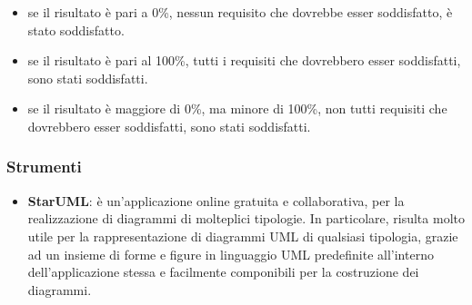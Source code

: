\begin{itemize}
\begin{itemize}
								\begin{itemize}
									\item se il risultato è pari a 0\%, nessun requisito che dovrebbe esser soddisfatto, è stato soddisfatto.
									\item se il risultato è pari al 100\%, tutti i requisiti che dovrebbero esser soddisfatti,  sono stati soddisfatti.
									\item se il risultato è maggiore di 0\%, ma minore di 100\%, non tutti requisiti che dovrebbero esser soddisfatti, sono stati soddisfatti.
								\end{itemize}
						\end{itemize}
				\end{itemize}
\iffalse
			\paragraph{Sicurezza}
			\paragraph{Affidabilità}
			\paragraph{Efficienza}
			\paragraph{Usabilità}
			\paragraph{Manutenibilità}
			\paragraph{Sviluppo}
\fi
	
		\subsubsection{Strumenti}
			\begin{itemize}
				\item\textbf{StarUML}: è un'applicazione online gratuita e collaborativa, per la realizzazione di diagrammi di molteplici tipologie. In particolare, risulta molto utile per la rappresentazione di diagrammi UML di qualsiasi tipologia, grazie ad un insieme di forme e figure in linguaggio UML predefinite all'interno dell'applicazione stessa e facilmente componibili per la costruzione dei diagrammi.
			\end{itemize}
			
			
			
			
			
			
			
			
			
			
			
			
			
			
			
\newpage		
				